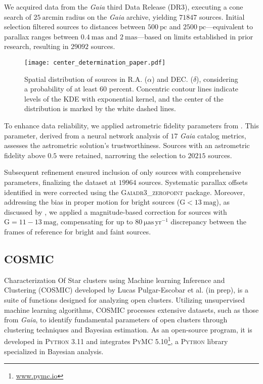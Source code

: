 \documentclass[baaa]{baaa}
\begin{document}
We acquired data from the \textit{Gaia} third Data Release (DR3), executing a cone search of $25~\mathrm{arcmin}$ radius on the \textit{Gaia} archive, yielding $71847$ sources. Initial selection filtered sources to distances between $500~\mathrm{pc}$ and $2500~\mathrm{pc}$—equivalent to parallax ranges between $0.4~\mathrm{mas}$ and $2~\mathrm{mas}$—based on limits established in prior research, resulting in $29092$ sources.

\begin{figure}
    \centering
    \texttt{[image: center\_determination\_paper.pdf]}
    \caption{Spatial distribution of sources in R.A. ($\alpha$) and DEC. ($\delta$), considering a probability of at least $60$ percent. Concentric contour lines indicate levels of the KDE with exponential kernel, and the center of the distribution is marked by the white dashed lines.}
    \label{fig:center}
\end{figure}

To enhance data reliability, we applied astrometric fidelity parameters from \cite{2022MNRAS.510.2597R}. This parameter, derived from a neural network analysis of $17$ \textit{Gaia} catalog metrics, assesses the astrometric solution's trustworthiness. Sources with an astrometric fidelity above $0.5$ were retained, narrowing the selection to $20215$ sources.

Subsequent refinement ensured inclusion of only sources with comprehensive parameters, finalizing the dataset at $19964$ sources. Systematic parallax offsets identified in \citet{2021A&A...649A...2L} were corrected using the \textsc{Gaiadr3\_zeropoint} package. Moreover, addressing the bias in proper motion for bright sources ($\mathrm{G}<13~\mathrm{mag}$), as discussed by \citet{2021A&A...649A.124C}, we applied a magnitude-based correction for sources with $\mathrm{G} = 11-13~\mathrm{mag}$, compensating for up to $80~\mathrm{\mu as\,yr^{-1}}$ discrepancy between the frames of reference for bright and faint sources.

\subsection{\sc COSMIC}

Characterization Of Star clusters using Machine learning Inference and Clustering (\textsc{COSMIC}) developed by Lucas Pulgar-Escobar et al. (in prep), is a suite of functions designed for analyzing open clusters. Utilizing unsupervised machine learning algorithms, \textsc{COSMIC} processes extensive datasets, such as those from \textit{Gaia}, to identify fundamental parameters of open clusters through clustering techniques and Bayesian estimation. As an open-source program, it is developed in \textsc{Python} 3.11 and integrates \textsc{PyMC} 5.10\footnote{\href{www.pymc.io}{www.pymc.io}}, a \textsc{Python} library specialized in Bayesian analysis.
\end{document}
